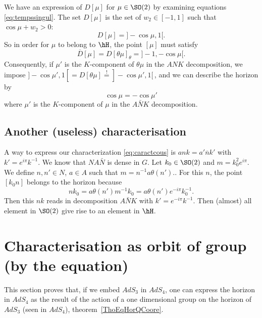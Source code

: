 We have an expression of $D[\mu]$ for $\mu\in \SO(2)$ by examining equations \eqref{eq:tempssingul}. The set $D[\mu]$ is the set of $w_2\in [-1,1]$ such that $\cos \mu+w_2>0$:
\begin{equation}
  D[\mu]=]-\cos \mu,1[.
\end{equation}
So in order for $\mu$ to belong to $\hH$, the point $[\mu]$ must satisfy
\[
\overline{D}[\mu]=D[\theta \mu]_{\theta}=]-1,-\cos \mu[.
\]
Consequently, if $\mu'$ is the $K$-component of $\theta \mu$ in the $ANK$ decomposition, we impose $]-\cos \mu',1[=D[\theta \mu]\stackrel{!}{=}]-\cos \mu',1[$\,, and we can describe the horizon by
\begin{equation} \label{eq:caractcous}
\cos \mu=-\cos \mu'
\end{equation}
where $\mu'$ is the $K$-component of $\mu$ in the $A\bar{N}K$ decomposition.


\subsection{Another (useless) characterisation}

A way to express our characterization \eqref{eq:caractcous} is $ank=a'\overline{n}k'$ with $k'=e^{i\pi}k^{-1}$. We know that $NA\bar{N}$ is dense in $G$. Let $k_0\in \SO(2)$ and $m=k_0^2e^{i\pi}$. We define $n,n'\in N$, $a\in A$ such that $m=n^{-1} a\theta(n')$.. For this $n$, the point $[k_0n]$ belongs to the horizon because
\begin{equation}
nk_0=a\theta(n')m^{-1} k_0
    =a\theta(n')e^{-i\pi}k_0^{-1}.
\end{equation}
Then this $nk$ reads in decomposition $A\bar{N}K$ with $k'=e^{-i\pi}k^{-1}$. Then (almost) all element in $\SO(2)$ give rise to an element in $\hH$.


					\section{Characterisation as orbit of group (by the equation)}
\label{SecHOrOrbEquation}

This section proves that, if we embed $AdS_3$ in $AdS_4$, one can express the horizon in $AdS_4$ as the result of the action of a one dimensional group on the horizon of $AdS_3$ (seen in $AdS_4$), theorem~\ref{ThoEqHorQCoore}.

